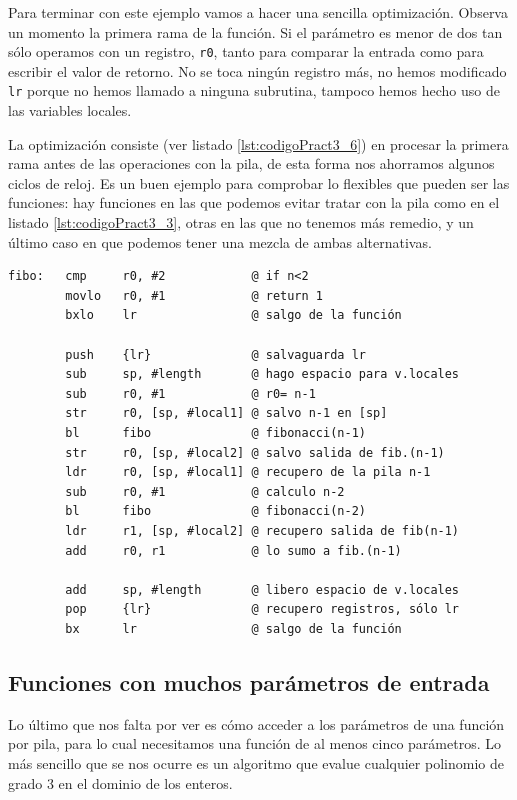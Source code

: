 Para terminar con este ejemplo vamos a hacer una sencilla optimización. Observa un momento
la primera rama de la función. Si el parámetro es menor de dos tan sólo operamos con
un registro, {\tt r0}, tanto para comparar la entrada como para escribir el valor de retorno.
No se toca ningún registro más, no hemos modificado {\tt lr} porque no hemos llamado a ninguna
subrutina, tampoco hemos hecho uso de las variables locales.

La optimización consiste (ver listado \ref{lst:codigoPract3_6}) en procesar la primera rama antes de las operaciones con la pila,
de esta forma nos ahorramos algunos ciclos de reloj. Es un buen ejemplo para comprobar
lo flexibles que pueden ser las funciones: hay funciones en las que podemos evitar tratar
con la pila como en el listado \ref{lst:codigoPract3_3}, otras en las que no tenemos más
remedio, y un último caso en que podemos tener una mezcla de ambas alternativas.

\begin{lstlisting}[caption={Parte del código del programa subrut4.s},label={lst:codigoPract3_6}]
fibo:   cmp     r0, #2            @ if n<2
        movlo   r0, #1            @ return 1
        bxlo    lr                @ salgo de la función

        push    {lr}              @ salvaguarda lr
        sub     sp, #length       @ hago espacio para v.locales
        sub     r0, #1            @ r0= n-1
        str     r0, [sp, #local1] @ salvo n-1 en [sp]
        bl      fibo              @ fibonacci(n-1)
        str     r0, [sp, #local2] @ salvo salida de fib.(n-1)
        ldr     r0, [sp, #local1] @ recupero de la pila n-1
        sub     r0, #1            @ calculo n-2
        bl      fibo              @ fibonacci(n-2)
        ldr     r1, [sp, #local2] @ recupero salida de fib(n-1)
        add     r0, r1            @ lo sumo a fib.(n-1)

        add     sp, #length       @ libero espacio de v.locales
        pop     {lr}              @ recupero registros, sólo lr
        bx      lr                @ salgo de la función
\end{lstlisting}

\subsection{Funciones con muchos parámetros de entrada}

Lo último que nos falta por ver es cómo acceder a los parámetros de una función por pila, para
lo cual necesitamos una función de al menos cinco parámetros. Lo más sencillo que se nos ocurre
es un algoritmo que evalue cualquier polinomio de grado 3 en el dominio de los enteros.


